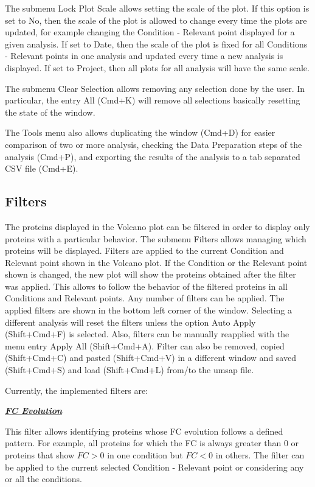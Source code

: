 The submenu Lock Plot Scale allows setting the scale of the plot. If this option
is set to No, then the scale of the plot is allowed to change every time the plots
are updated, for example changing the Condition - Relevant point displayed for a
given analysis. If set to Date, then the scale of the plot is fixed for all Conditions
- Relevant points in one analysis and updated every time a new analysis is displayed.
If set to Project, then all plots for all analysis will have the same scale.

The submenu Clear Selection allows removing any selection done by the user. In
particular, the entry All (Cmd+K) will remove all selections basically resetting
the state of the window.

The Tools menu also allows duplicating the window (Cmd+D) for easier comparison of
two or more analysis, checking the Data Preparation steps of the analysis (Cmd+P),
and exporting the results of the analysis to a tab separated CSV file (Cmd+E).

\newpage
\subsection{Filters}

The proteins displayed in the Volcano plot can be filtered in order to display only
proteins with a particular behavior. The submenu Filters allows managing which 
proteins will be displayed. Filters are applied to the current Condition and Relevant
point shown in the Volcano plot. If the Condition or the Relevant point shown is
changed, the new plot will show the proteins obtained after the filter was applied.
This allows to follow the behavior of the filtered proteins in all Conditions and
Relevant points. Any number of filters can be applied. The applied filters are shown
in the bottom left corner of the window. Selecting a different analysis will reset
the filters unless the option Auto Apply (Shift+Cmd+F) is selected. Also, filters
can be manually reapplied with the menu entry Apply All (Shift+Cmd+A). Filter can
also be removed, copied (Shift+Cmd+C) and pasted (Shift+Cmd+V) in a different window
and saved (Shift+Cmd+S) and load (Shift+Cmd+L) from/to the umsap file.

Currently, the implemented filters are:

\textbf{\textit{\underline{FC Evolution}}}

This filter allows identifying proteins whose FC evolution follows a defined pattern.
For example, all proteins for which the FC is always greater than \num{0} or proteins
that show $FC > 0$ in one condition but $FC < 0$ in others. The filter can be applied
to the current selected Condition - Relevant point or considering any or all the
conditions.

